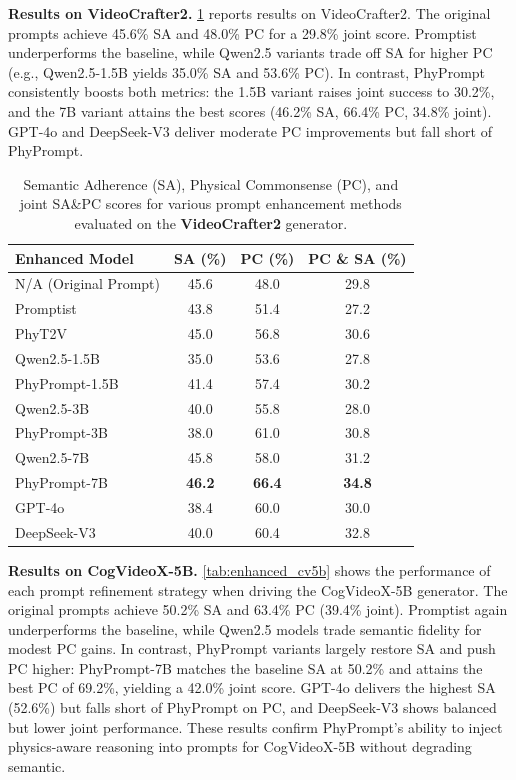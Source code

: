\textbf{Results on VideoCrafter2.}
\cref{tab:enhanced_vc2} reports results on VideoCrafter2. The original prompts achieve 45.6\% SA and 48.0\% PC for a 29.8\% joint score. Promptist underperforms the baseline, while Qwen2.5 variants trade off SA for higher PC (e.g., Qwen2.5-1.5B yields 35.0\% SA and 53.6\% PC). In contrast, PhyPrompt consistently boosts both metrics: the 1.5B variant raises joint success to 30.2\%, and the 7B variant attains the best scores (46.2\% SA, 66.4\% PC, 34.8\% joint). GPT-4o and DeepSeek-V3 deliver moderate PC improvements but fall short of PhyPrompt.
\begin{table}[ht]
  \centering
  \caption{Semantic Adherence (SA), Physical Commonsense (PC), and joint SA\&PC scores for various prompt enhancement methods evaluated on the \textbf{VideoCrafter2} generator.}
  \setlength{\tabcolsep}{3pt}
  \label{tab:enhanced_vc2}
  \begin{tabular}{lccc}
    \toprule
    \textbf{Enhanced Model} & \textbf{SA (\%)} & \textbf{PC (\%)} & \textbf{PC \& SA (\%)} \\
    \midrule
    N/A (Original Prompt) & 45.6 & 48.0 & 29.8 \\
    Promptist             & 43.8 & 51.4 & 27.2 \\
    PhyT2V                & 45.0 & 56.8 & 30.6 \\
    \midrule
    Qwen2.5-1.5B          & 35.0 & 53.6 & 27.8 \\
    PhyPrompt-1.5B        & 41.4 & 57.4 & 30.2 \\
    Qwen2.5-3B            & 40.0 & 55.8 & 28.0 \\
    PhyPrompt-3B          & 38.0 & 61.0 & 30.8 \\
    Qwen2.5-7B            & 45.8 & 58.0 & 31.2 \\
    PhyPrompt-7B          & \textbf{46.2} & \textbf{66.4} & \textbf{34.8} \\
    \midrule
    GPT-4o                & 38.4 & 60.0 & 30.0 \\
    DeepSeek-V3           & 40.0 & 60.4 & 32.8 \\
    \bottomrule
  \end{tabular}
\end{table}

\textbf{Results on CogVideoX-5B.}
\cref{tab:enhanced_cv5b} shows the performance of each prompt refinement strategy when driving the CogVideoX-5B generator. The original prompts achieve 50.2\% SA and 63.4\% PC (39.4\% joint). Promptist again underperforms the baseline, while Qwen2.5 models trade semantic fidelity for modest PC gains.
In contrast, PhyPrompt variants largely restore SA and push PC higher: PhyPrompt-7B matches the baseline SA at 50.2\% and attains the best PC of 69.2\%, yielding a 42.0\% joint score.
GPT-4o delivers the highest SA (52.6\%) but falls short of PhyPrompt on PC, and DeepSeek-V3 shows balanced but lower joint performance.
These results confirm PhyPrompt’s ability to inject physics-aware reasoning into prompts for CogVideoX-5B without degrading semantic.

